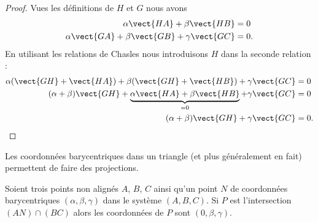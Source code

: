 \begin{proof}
    Vues les définitions de \( H\) et \( G\) nous avons
    \begin{subequations}
        \begin{align}
            \alpha\vect{ HA }+\beta\vect{ HB }&=0\\
            \alpha\vect{ GA }+\beta\vect{ GB }+\gamma\vect{ GC }&=0.
        \end{align}
    \end{subequations}
    En utilisant les relations de Chasles nous introduisons \( H\) dans la seconde relation :
    \begin{subequations}
        \begin{align}
            \alpha(\vect{ GH }+\vect{ HA })+\beta(\vect{ GH }+\vect{ HB })+\gamma\vect{ GC }&=0\\
            (\alpha+\beta)\vect{ GH }+\underbrace{  \alpha\vect{ HA }+\beta\vect{ HB }   }_{=0}+\gamma\vect{ GC }&=0\\
            (\alpha+\beta)\vect{ GH }+\gamma\vect{ GC }&=0.
        \end{align}
    \end{subequations}
\end{proof}

Les coordonnées barycentriques dans un triangle (et plus généralement en fait) permettent de faire des projections.

\begin{proposition}     \label{PROPooBCUVooWKttiH}
    Soient trois points non alignés \( A\), \( B\), \( C\) ainsi qu'un point \( N\) de coordonnées barycentriques  \( (\alpha,\beta,\gamma) \) dans le système $(A,B,C)$. Si \( P\) est l'intersection \( (AN)\cap(BC)\) alors les coordonnées de \( P\) sont \( (0,\beta,\gamma)\).
\end{proposition}

